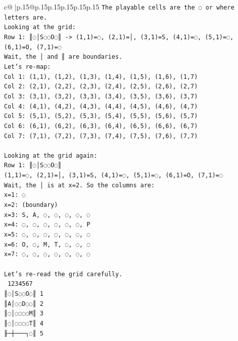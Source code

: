 \documentclass{article}
\begin{document}
{\begin{supertabular}{c@{$\;$}|p{.15\linewidth}@{}p{.15\linewidth}p{.15\linewidth}p{.15\linewidth}p{.15\linewidth}p{.15\linewidth}}
{{{\texttt{The playable cells are the ◌ or where letters are.} \\
\texttt{Looking at the grid:} \\
\texttt{Row 1: ║◌│S◌◌O◌║ {-}> (1,1)=◌, (2,1)=│, (3,1)=S, (4,1)=◌, (5,1)=◌, (6,1)=O, (7,1)=◌} \\
\texttt{Wait, the │ and ║ are boundaries.} \\
\texttt{Let's re{-}map:} \\
\texttt{Col 1: (1,1), (1,2), (1,3), (1,4), (1,5), (1,6), (1,7)} \\
\texttt{Col 2: (2,1), (2,2), (2,3), (2,4), (2,5), (2,6), (2,7)} \\
\texttt{Col 3: (3,1), (3,2), (3,3), (3,4), (3,5), (3,6), (3,7)} \\
\texttt{Col 4: (4,1), (4,2), (4,3), (4,4), (4,5), (4,6), (4,7)} \\
\texttt{Col 5: (5,1), (5,2), (5,3), (5,4), (5,5), (5,6), (5,7)} \\
\texttt{Col 6: (6,1), (6,2), (6,3), (6,4), (6,5), (6,6), (6,7)} \\
\texttt{Col 7: (7,1), (7,2), (7,3), (7,4), (7,5), (7,6), (7,7)} \\
\\ 
\texttt{Looking at the grid again:} \\
\texttt{Row 1: ║◌│S◌◌O◌║} \\
\texttt{(1,1)=◌, (2,1)=│, (3,1)=S, (4,1)=◌, (5,1)=◌, (6,1)=O, (7,1)=◌} \\
\texttt{Wait, the │ is at x=2. So the columns are:} \\
\texttt{x=1: ◌} \\
\texttt{x=2: (boundary)} \\
\texttt{x=3: S, A, ◌, ◌, ◌, ◌, ◌} \\
\texttt{x=4: ◌, ◌, ◌, ◌, ◌, ◌, P} \\
\texttt{x=5: ◌, ◌, ◌, ◌, ◌, ◌, ◌} \\
\texttt{x=6: O, ◌, M, T, ◌, ◌, ◌} \\
\texttt{x=7: ◌, ◌, ◌, ◌, ◌, ◌, ◌} \\
\\ 
\texttt{Let's re{-}read the grid carefully.} \\
\texttt{ 1234567} \\
\texttt{║◌│S◌◌O◌║ 1} \\
\texttt{║A│◌◌D◌◌║ 2} \\
\texttt{║◌│◌◌◌◌M║ 3} \\
\texttt{║◌│◌◌◌◌T║ 4} \\
\texttt{╟─┼───┐◌║ 5} \\
}}}
\end{supertabular}}
\end{document}

